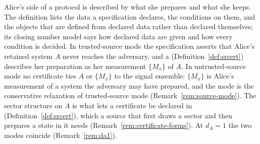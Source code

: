 
Alice's side of a protocol is described by what she prepares and what she
keeps. The definition lists the data a specification declares, the
conditions on them, and the objects that are defined from declared data
rather than declared themselves; its closing number model says how declared
data are given and how every condition is decided. In trusted-source mode the specification asserts that Alice's retained system
$A$ never reaches the adversary, and a 
(Definition~\ref{def:srcert}) describes her preparation as her measurement
$\{M_x\}$ of $A$. In untrusted-source mode no certificate ties $A$ or
$\{M_x\}$ to the signal ensemble: $\{M_x\}$ is Alice's measurement of a system
the adversary may have prepared, and the mode is the conservative
relaxation of trusted-source mode (Remark~\ref{rem:source-mode}). The sector
structure on $A$ is what lets a certificate be declared in 
(Definition~\ref{def:srcert}), which a source that first draws a sector and
then prepares a state in it needs (Remark~\ref{rem:certificate-forms}).
At $d_A=1$ the two modes coincide (Remark~\ref{rem:da1}).

